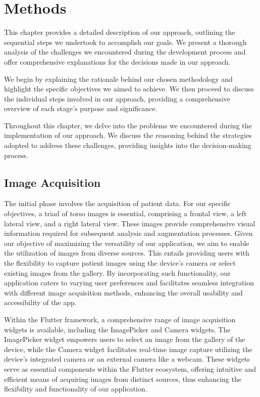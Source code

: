 \chapter{Methods}

This chapter provides a detailed description of our approach, outlining the sequential steps we undertook to accomplish our goals. We present a thorough analysis of the challenges we encountered during 
the development process and offer comprehensive explanations for the decisions made in our approach.

We begin by explaining the rationale behind our chosen methodology and highlight the specific objectives we aimed to achieve. We then proceed to discuss the individual steps involved in our approach, 
providing a comprehensive overview of each stage's purpose and significance.

Throughout this chapter, we delve into the problems we encountered during the implementation of our approach. We discuss the reasoning behind the strategies adopted to address these challenges, 
providing insights into the decision-making process.

\section{Image Acquisition}

The initial phase involves the acquisition of patient data. For our specific objectives, a triad of torso images is essential, comprising a frontal view, a left lateral view, and a right lateral view. 
These images provide comprehensive visual information required for subsequent analysis and augmentation processes. Given our objective of maximizing the versatility of our application, 
we aim to enable the utilization of images from diverse sources. This entails providing users with the flexibility to capture patient images using the device's camera or select existing images from the gallery. 
By incorporating such functionality, our application caters to varying user preferences and facilitates seamless integration with different image acquisition methods, 
enhancing the overall usability and accessibility of the app.

Within the Flutter framework, a comprehensive range of image acquisition widgets is available, including the ImagePicker and Camera widgets. 
The ImagePicker widget empowers users to select an image from the gallery of the device, while the Camera widget facilitates real-time image capture utilizing the device's integrated camera 
or an external camera like a webcam. These widgets serve as essential components within the Flutter ecosystem, offering intuitive and efficient means of acquiring images from distinct sources, 
thus enhancing the flexibility and functionality of our application.

